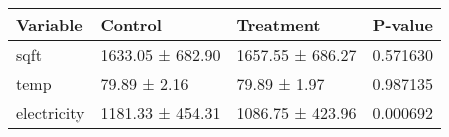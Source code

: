 \begin{tabular}{lllr}
\toprule
Variable & Control & Treatment & P-value \\
\midrule
sqft & 1633.05 ± 682.90 & 1657.55 ± 686.27 & 0.571630 \\
temp & 79.89 ± 2.16 & 79.89 ± 1.97 & 0.987135 \\
electricity & 1181.33 ± 454.31 & 1086.75 ± 423.96 & 0.000692 \\
\bottomrule
\end{tabular}
